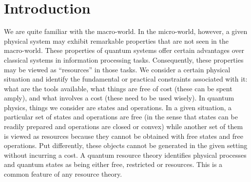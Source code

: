 \documentclass[american,aps,pra,reprint, superscriptaddress]{revtex4-1}
\theoremstyle{plain}
\theoremstyle{definition}
\theoremstyle{remark}
\begin{document}
\section{Introduction}

We are quite familiar with the macro-world. 
In the micro-world, however, a given physical system may exhibit remarkable properties that are not seen in the macro-world. These properties of quantum systems offer certain advantages over classical systems in information processing tasks. Consequently, these properties may be viewed as ``resources'' in those tasks. 
We consider a certain physical situation and identify the fundamental or practical constraints associated with it: what are the tools available, what things are free of cost (these can be spent amply), and what involves a cost (these need to be used wisely). 
In quantum physics, things we consider are states and operations. In a given situation, a particular set of states and operations are free (in the sense that states can be readily prepared and operations are closed or convex) while another set of them is viewed as resources because they cannot be obtained with free states and free operations. Put differently, these objects cannot be generated in the given setting without incurring a cost.
A quantum resource theory identifies physical processes and quantum states as being either free, restricted or resources. This is a common feature of any resource theory.
\end{document}
